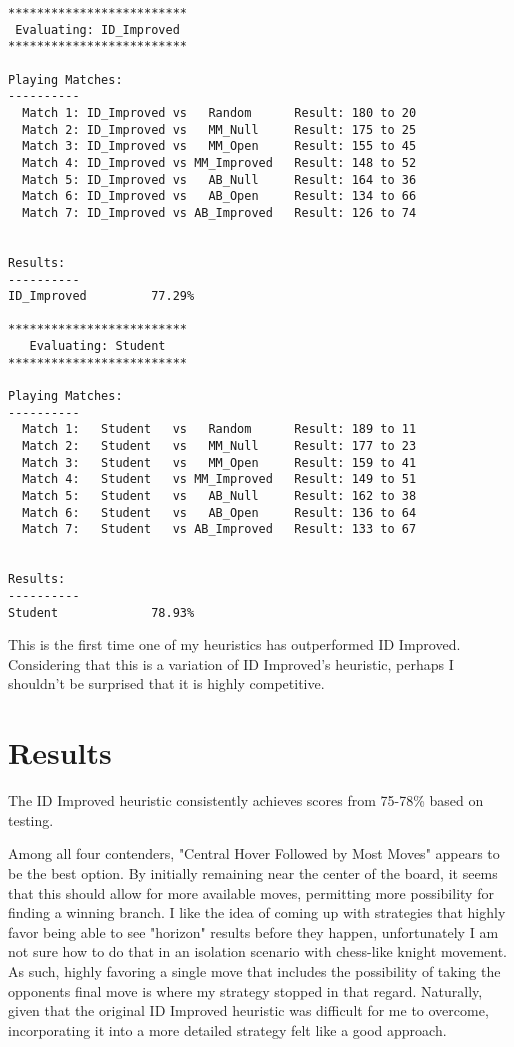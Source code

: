 \documentclass[10pt, a4paper]{article}
\begin{document}
\begin{verbatim}
*************************
 Evaluating: ID_Improved 
*************************

Playing Matches:
----------
  Match 1: ID_Improved vs   Random    	Result: 180 to 20
  Match 2: ID_Improved vs   MM_Null   	Result: 175 to 25
  Match 3: ID_Improved vs   MM_Open   	Result: 155 to 45
  Match 4: ID_Improved vs MM_Improved 	Result: 148 to 52
  Match 5: ID_Improved vs   AB_Null   	Result: 164 to 36
  Match 6: ID_Improved vs   AB_Open   	Result: 134 to 66
  Match 7: ID_Improved vs AB_Improved 	Result: 126 to 74


Results:
----------
ID_Improved         77.29%

*************************
   Evaluating: Student   
*************************

Playing Matches:
----------
  Match 1:   Student   vs   Random    	Result: 189 to 11
  Match 2:   Student   vs   MM_Null   	Result: 177 to 23
  Match 3:   Student   vs   MM_Open   	Result: 159 to 41
  Match 4:   Student   vs MM_Improved 	Result: 149 to 51
  Match 5:   Student   vs   AB_Null   	Result: 162 to 38
  Match 6:   Student   vs   AB_Open   	Result: 136 to 64
  Match 7:   Student   vs AB_Improved 	Result: 133 to 67


Results:
----------
Student             78.93%
\end{verbatim}

This is the first time one of my heuristics has outperformed ID Improved.  Considering that this
is a variation of ID Improved's heuristic, perhaps I shouldn't be surprised that it is highly competitive.

\section{Results}

The ID Improved heuristic consistently achieves scores from 75-78\% based on testing.

Among all four contenders, "Central Hover Followed by Most Moves" appears to be the best option.
By initially remaining near the center of the board, it seems
that this should allow for more available moves, permitting more possibility for finding a winning branch.
I like the idea of coming up with strategies that highly favor being able to see "horizon" results 
before they happen, unfortunately I am not sure how to do that in an isolation scenario with chess-like knight movement.
As such, highly favoring a single move that includes the possibility of taking the opponents final move
is where my strategy stopped in that regard.  Naturally, given that the original ID Improved heuristic
was difficult for me to overcome, incorporating it into a more detailed strategy felt like a good approach.
\end{document}
